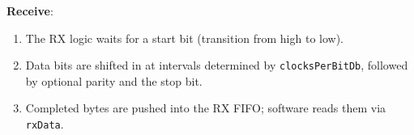 \noindent
\textbf{Receive}:
\begin{enumerate}
  \item The RX logic waits for a start bit (transition from high to low).
  \item Data bits are shifted in at intervals determined by \texttt{clocksPerBitDb}, followed by optional parity and the stop bit.
  \item Completed bytes are pushed into the RX FIFO; software reads them via \texttt{rxData}.
\end{enumerate}
